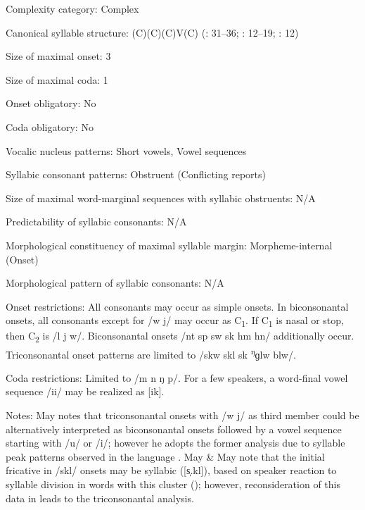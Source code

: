 {\begin{appendixdesc}
\item[Complexity category:] Complex

\item[Canonical syllable structure:] (C)(C)(C)V(C) (\citealt{Anceaux1965}: 31--36; \citealt{May1997}: 12--19; \citealt{MayMay1981}: 12)

\item[Size of maximal onset:] 3

\item[Size of maximal coda:] 1

\item[Onset obligatory:] No

\item[Coda obligatory:] No

\item[Vocalic nucleus patterns:] Short vowels, Vowel sequences

\item[Syllabic consonant patterns:] Obstruent (Conflicting reports)

\item[Size of maximal word-marginal sequences with syllabic obstruents:] N/A

\item[Predictability of syllabic consonants:] N/A

\item[Morphological constituency of maximal syllable margin:] Morpheme-internal (Onset)

\item[Morphological pattern of syllabic consonants:] N/A

\item[Onset restrictions:] All consonants may occur as simple onsets. In biconsonantal onsets, all consonants except for /w j/ may occur as C\textsubscript{1}. If C\textsubscript{1} is nasal or stop, then C\textsubscript{2} is /l j w/. Biconsonantal onsets /nt sp sw sk hm hn/ additionally occur. Triconsonantal onset patterns are limited to /skw skl sk \textsuperscript{ŋ}ɡlw blw/.

\item[Coda restrictions:] Limited to /m n ŋ p/. For a few speakers, a word-final vowel sequence /ii/ may be realized as [ik].

\item[Notes:] May notes that triconsonantal onsets with /w j/ as third member could be alternatively interpreted as biconsonantal onsets followed by a vowel sequence starting with /u/ or /i/; however he adopts the former analysis due to syllable peak patterns observed in the language \citep[17--18]{May1997}. May \& May note that the initial fricative in /skl/ onsets may be syllabic ([s̩.kl]), based on speaker reaction to syllable division in words with this cluster (\citeyear[29]{MayMay1981}); however, reconsideration of this data in \citet{May1997} leads to the triconsonantal analysis.
\end{appendixdesc}
}
